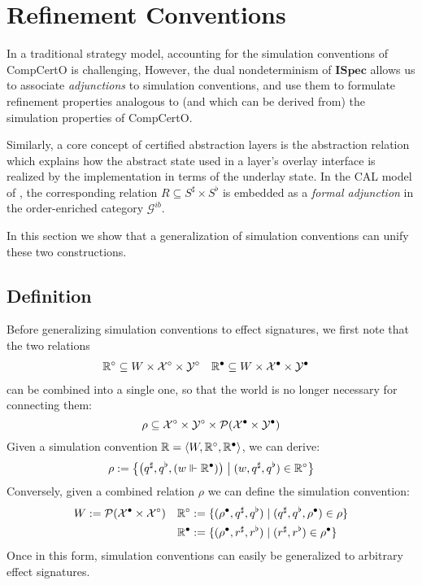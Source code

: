 \documentclass[acmsmall,review,anonymous]{acmart}\settopmatter{printfolios=true,printccs=false,printacmref=false}
\newcommand{\ISpec}{\mathbf{ISpec}}
\begin{document}
\section{Refinement Conventions} \label{sec:refconv} %

In a traditional strategy model,
accounting for the simulation conventions of CompCertO is challenging,
However,
the dual nondeterminism of $\ISpec$
allows us to associate \emph{adjunctions}
to simulation conventions,
and use them to formulate refinement properties
analogous to (and which can be derived from)
the simulation properties of CompCertO.

Similarly,
a core concept of certified abstraction layers
is the abstraction relation
which explains how the abstract state
used in a layer's overlay interface
is realized by the implementation
in terms of the underlay state.
In the CAL model of \citep{lics20},
the corresponding relation $R \subseteq S^\sharp \times S^\flat$
is embedded as a \emph{formal adjunction}
in the order-enriched category $\mathcal{G}^{ib}$.

In this section we show that a generalization of
simulation conventions can unify these two constructions.

\subsection{Definition} \label{sec:refconvdef} %

Before generalizing simulation conventions to effect signatures,
we first note that the two relations
\begin{align*}
  \mathbb{R}^\circ &\subseteq W \times \mathcal{X}^\circ \times \mathcal{Y}^\circ &
  \mathbb{R}^\bullet &\subseteq W \times \mathcal{X}^\bullet \times \mathcal{Y}^\bullet
\end{align*}
can be combined into a single one,
so that the world is no longer necessary for connecting them:
\[
  \rho \subseteq \mathcal{X}^\circ \times \mathcal{Y}^\circ \times
    \mathcal{P}(\mathcal{X}^\bullet \times \mathcal{Y}^\bullet)
\]
Given a simulation convention
$\mathbb{R} = \langle W, \mathbb{R}^\circ, \mathbb{R}^\bullet \rangle$,
we can derive:
\[
  \rho := \big\{
    \big(q^\sharp, q^\flat, (w \Vdash \mathbb{R}^\bullet) \big)
    \mathrel{\big|} (w, q^\sharp, q^\flat) \in \mathbb{R}^\circ \big\}
\]
Conversely, given a combined relation $\rho$
we can define the simulation convention:
\begin{align*}
  W &:= \mathcal{P}(\mathcal{X}^\bullet \times \mathcal{X}^\circ) &
  \mathbb{R}^\circ &:= \{ (\rho^\bullet, q^\sharp, q^\flat)
 \mid (q^\sharp, q^\flat, \rho^\bullet) \in \rho \} \\&&
  \mathbb{R}^\bullet &:= \{ (\rho^\bullet, r^\sharp, r^\flat)
 \mid (r^\sharp, r^\flat) \in \rho^\bullet \}
\end{align*}
Once in this form,
simulation conventions
can easily be generalized to arbitrary effect signatures.
\end{document}
